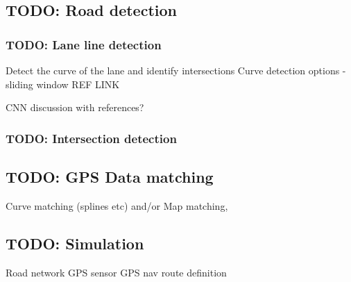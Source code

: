\documentclass[]{aiaa-tc}%
\begin{document}
\subsection{TODO: Road detection}

\subsubsection{TODO: Lane line detection}

Detect the curve of the lane and identify intersections
Curve detection options - sliding window REF LINK %

CNN discussion with references?

\subsubsection{TODO: Intersection detection}

\subsection{TODO: GPS Data matching}
Curve matching (splines etc) and/or Map matching, 

\subsection{TODO: Simulation}

Road network
GPS sensor
GPS nav route definition
\end{document}
